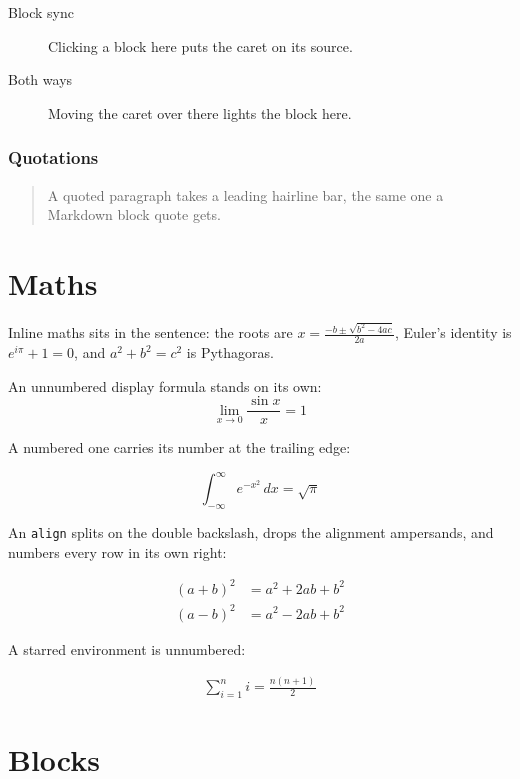 \documentclass[11pt]{article}
\begin{document}
\begin{description}
  \item[Block sync] Clicking a block here puts the caret on its source.
  \item[Both ways] Moving the caret over there lights the block here.
\end{description}

\subsubsection{Quotations}

\begin{quote}
A quoted paragraph takes a leading hairline bar, the same one a Markdown block
quote gets.
\end{quote}

\section{Maths}
\label{sec:maths}

Inline maths sits in the sentence: the roots are
$x = \frac{-b \pm \sqrt{b^2 - 4ac}}{2a}$, Euler's identity is
$e^{i\pi} + 1 = 0$, and \(a^2 + b^2 = c^2\) is Pythagoras.

An unnumbered display formula stands on its own:
\[
  \lim_{x \to 0} \frac{\sin x}{x} = 1
\]

A numbered one carries its number at the trailing edge:

\begin{equation}
\label{eq:gauss}
\int_{-\infty}^{\infty} e^{-x^2}\,dx = \sqrt{\pi}
\end{equation}

An \texttt{align} splits on the double backslash, drops the alignment
ampersands, and numbers every row in its own right:

\begin{align}
(a + b)^2 &= a^2 + 2ab + b^2 \\
(a - b)^2 &= a^2 - 2ab + b^2
\end{align}

A starred environment is unnumbered:

\begin{gather*}
\sum_{i=1}^{n} i = \frac{n(n+1)}{2}
\end{gather*}

\section{Blocks}
\end{document}
